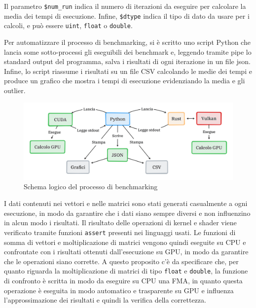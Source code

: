 Il parametro \verb|$num_run| indica il numero di iterazioni da eseguire per calcolare la media dei tempi di esecuzione. Infine, \verb|$dtype| indica il tipo di dato da usare per i calcoli, e può essere \verb|uint|, \verb|float| o \verb|double|.

Per automatizzare il processo di benchmarking, si è scritto uno script Python che lancia some sotto-processi gli eseguibili dei benchmark e, leggendo tramite pipe lo standard output del programma, salva i risultati di ogni iterazione in un file json. Infine, lo script riassume i risultati su un file CSV calcolando le medie dei tempi e produce un grafico che mostra i tempi di esecuzione evidenziando la media e gli outlier.

\begin{figure}[ht]
  \centering
  \includegraphics[width=1\linewidth]{images/chapter4/arch_bench.png}
  \caption{Schema logico del processo di benchmarking}
  \label{fig:arch_bench}
\end{figure}


I dati contenuti nei vettori e nelle matrici sono stati generati casualmente a ogni esecuzione, in modo da garantire che i dati siano sempre diversi e non influenzino in alcun modo i risultati. Il risultato delle operazioni di kernel e shader viene verificato tramite funzioni \verb|assert| presenti nei linguaggi usati. Le funzioni di somma di vettori e moltiplicazione di matrici vengono quindi eseguite su CPU e confrontate con i risultati ottenuti dall'esecuzione su GPU, in modo da garantire che le operazioni siano corrette. A questo proposito c'è da specificare che, per quanto riguarda la moltiplicazione di matrici di tipo \verb|float| e \verb|double|, la funzione di confronto è scritta in modo da eseguire su CPU una \gls{FMA}, in quanto questa operazione è eseguita in modo automatico e trasparente su GPU e influenza l'approssimazione dei risultati e quindi la verifica della correttezza. 



